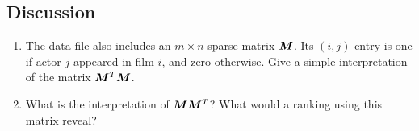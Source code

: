 \documentclass[11pt,twoside]{article}
\begin{document}
\subsection*{Discussion}
\begin{enumerate}
\item The data file also includes an $m\times n$ sparse matrix $\bm{M}$. Its $(i,j)$ entry is one if actor $j$ appeared in film $i$, and zero otherwise. Give a simple interpretation of the matrix $\bm{M}^T\bm{M}$.
\item What is the interpretation of $\bm{M}\bm{M}^T$? What would a ranking using this matrix reveal? 
\end{enumerate}
    
    
    
\end{document}
